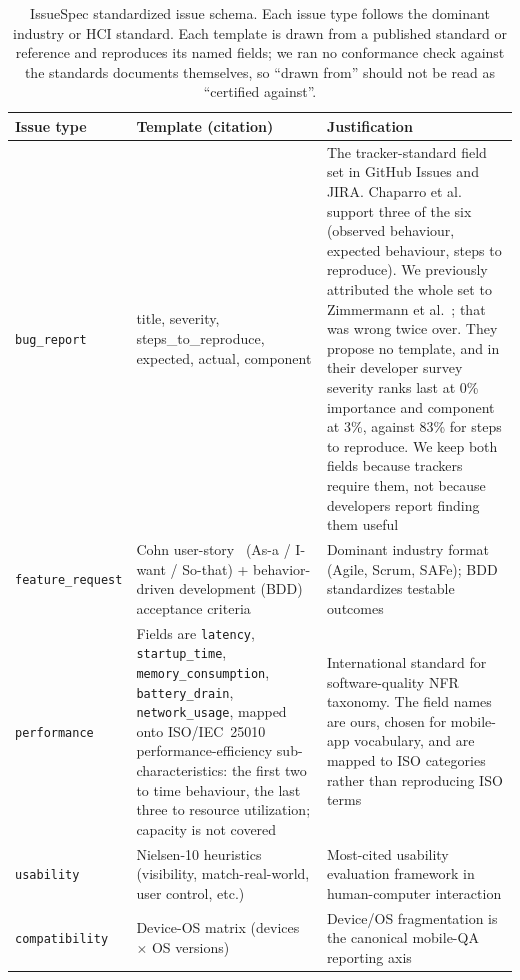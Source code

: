 \documentclass[sigconf, anonymous]{acmart}
\begin{document}
\begin{table}[t]
  \centering
  \footnotesize
  \caption{IssueSpec standardized issue schema. Each issue type follows the dominant industry or
  HCI standard. Each template is drawn from a published standard or reference and reproduces its
  named fields; we ran no conformance check against the standards documents themselves, so
  ``drawn from'' should not be read as ``certified against''.}\label{tab:templates}
  \begin{tabular}{@{}p{2.2cm}p{8.5cm}p{6.0cm}@{}}
  \toprule
  Issue type & Template (citation) & Justification \\
  \midrule
  \texttt{bug\_report} & title, severity, steps\_to\_reproduce, expected, actual, component &
  The tracker-standard field set in GitHub Issues and JIRA. Chaparro et
  al.~\cite{chaparro2017detecting} support three of the six (observed behaviour, expected
  behaviour, steps to reproduce). We previously attributed the whole set to
  Zimmermann et al.~\cite{zimmermann2010makes}; that was wrong twice over. They propose no
  template, and in their developer survey severity ranks last at 0\% importance and component at
  3\%, against 83\% for steps to reproduce. We keep both fields because trackers require them, not
  because developers report finding them useful \\
  \texttt{feature\_request} & Cohn user-story~\cite{cohn2004user} (As-a / I-want / So-that) +
  behavior-driven development (BDD) acceptance criteria~\cite{hellesoy2017cucumber} & Dominant
  industry format (Agile, Scrum, SAFe); BDD standardizes testable outcomes \\
  \texttt{performance} & Fields are \texttt{latency}, \texttt{startup\_time},
  \texttt{memory\_consumption}, \texttt{battery\_drain}, \texttt{network\_usage}, mapped onto
  ISO/IEC~25010~\cite{international2011systems} performance-efficiency sub-characteristics: the
  first two to time behaviour, the last three to resource utilization; capacity is not covered &
  International standard for software-quality NFR taxonomy. The field names are ours, chosen for
  mobile-app vocabulary, and are mapped to ISO categories rather than reproducing ISO terms \\
  \texttt{usability} & Nielsen-10 heuristics~\cite{nielsen1994usability} (visibility, match-real-world,
  user control, etc.) & Most-cited usability evaluation framework in human-computer interaction
  \\ 
  \texttt{compatibility} & Device-OS matrix (devices $\times$ OS
  versions)~\cite{joorabchi2013real} & Device/OS fragmentation is the canonical mobile-QA
  reporting axis \\   
  \bottomrule
  \end{tabular}
  \end{table}
\end{document}
